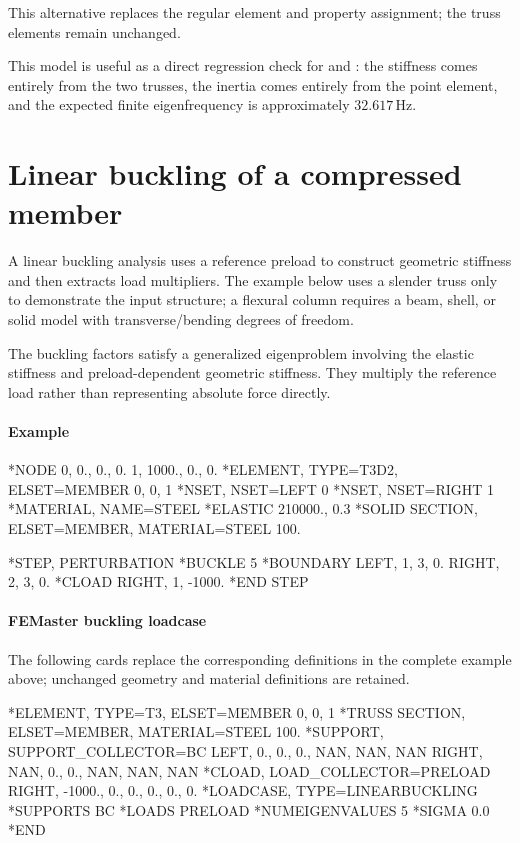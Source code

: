 This alternative replaces the regular  element and
 property assignment; the truss elements remain unchanged.

This model is useful as a direct regression check for  and : the stiffness comes entirely from the two trusses, the inertia comes entirely from the point element, and the expected finite eigenfrequency is approximately \(32.617\,\mathrm{Hz}\).

\section{Linear buckling of a compressed member}

A linear buckling analysis uses a reference preload to construct geometric stiffness and then extracts load multipliers. The example below uses a slender truss only to demonstrate the input structure; a flexural column requires a beam, shell, or solid model with transverse/bending degrees of freedom.

The buckling factors satisfy a generalized eigenproblem involving the elastic stiffness and preload-dependent geometric stiffness. They multiply the reference load rather than representing absolute force directly.

\paragraph*{Example}

\begin{inputdeck}
*NODE
0, 0., 0., 0.
1, 1000., 0., 0.
*ELEMENT, TYPE=T3D2, ELSET=MEMBER
0, 0, 1
*NSET, NSET=LEFT
0
*NSET, NSET=RIGHT
1
*MATERIAL, NAME=STEEL
*ELASTIC
210000., 0.3
*SOLID SECTION, ELSET=MEMBER, MATERIAL=STEEL
100.

*STEP, PERTURBATION
*BUCKLE
5
*BOUNDARY
LEFT, 1, 3, 0.
RIGHT, 2, 3, 0.
*CLOAD
RIGHT, 1, -1000.
*END STEP
\end{inputdeck}

\paragraph*{FEMaster buckling loadcase}

The following cards replace the corresponding definitions in the
complete example above; unchanged geometry and material definitions
are retained.

\begin{inputdeck}
*ELEMENT, TYPE=T3, ELSET=MEMBER
0, 0, 1
*TRUSS SECTION, ELSET=MEMBER, MATERIAL=STEEL
100.
*SUPPORT, SUPPORT_COLLECTOR=BC
LEFT, 0., 0., 0., NAN, NAN, NAN
RIGHT, NAN, 0., 0., NAN, NAN, NAN
*CLOAD, LOAD_COLLECTOR=PRELOAD
RIGHT, -1000., 0., 0., 0., 0., 0.
*LOADCASE, TYPE=LINEARBUCKLING
*SUPPORTS
BC
*LOADS
PRELOAD
*NUMEIGENVALUES
5
*SIGMA
0.0
*END
\end{inputdeck}

